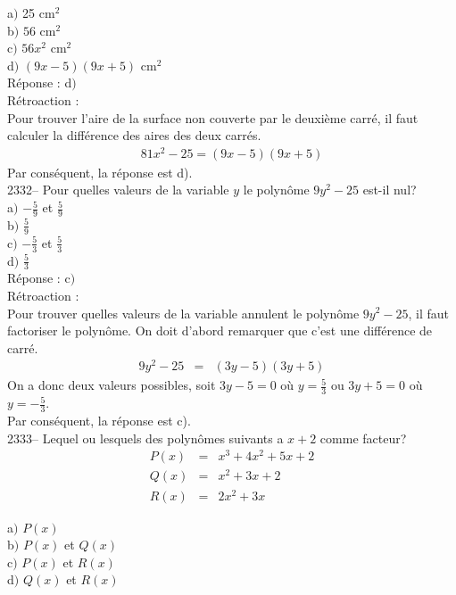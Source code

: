 \documentclass[letterpaper, 12pt]{article}
\begin{document}
a$)$ 25 cm$^{2}$\\
b$)$ $56$ cm$^{2}$\\
c$)$ $56x^{2}$ cm$^{2}$\\
d$)$ $(9x-5)(9x+5)$ cm$^{2}$\\

R\'eponse : d$)$\\

R\'etroaction :\\
Pour trouver l'aire de la surface non couverte par le deuxi\`eme carr\'e, il faut calculer la diff\'erence des aires des deux carr\'es.
\begin{eqnarray*}
81x^{2}-25 =(9x-5)(9x+5)
\end{eqnarray*}
Par cons\'equent, la r\'eponse est d).\\


2332-- Pour quelles valeurs de la variable $y$ le polyn\^ome $ 9y^{2}-25$ est-il nul?\\

a$)$ $-\frac{5}{9}$ et $\frac{5}{9}$\\[2mm]
b$)$ $\frac{5}{9}$\\[2mm]
c$)$ $-\frac{5}{3}$ et $\frac{5}{3}$\\[2mm]
d$)$ $\frac{5}{3}$\\

R\'eponse : c$)$\\

R\'etroaction :\\
Pour trouver quelles valeurs de la variable annulent le polyn\^ome $ 9y^{2}-25$, il faut factoriser le polyn\^ome. On doit d'abord remarquer que c'est une diff\'erence de carr\'e.
\begin{eqnarray*}
 9y^{2}-25&=&(3y-5)(3y+5)
\end{eqnarray*}
On a donc deux valeurs possibles, soit $3y-5=0$ o\`u $y=\frac{5}{3}$ ou $3y+5=0$ o\`u $y=-\frac{5}{3}$.\\
Par cons\'equent, la r\'eponse est c).\\

2333-- Lequel ou lesquels des polyn\^omes suivants a $x+2$ comme facteur?
\begin{eqnarray*}
P(x)&=&x^{3}+4x^{2}+5x+2\\
Q(x)&=&x^{2}+3x+2\\
R(x)&=&2x^{2}+3x
\end{eqnarray*}

a$)$ $P(x)$\\
b$)$ $P(x)$ et $Q(x)$ \\
c$)$ $P(x)$ et $R(x)$\\
d$)$ $Q(x)$ et $R(x)$\\
\end{document}
